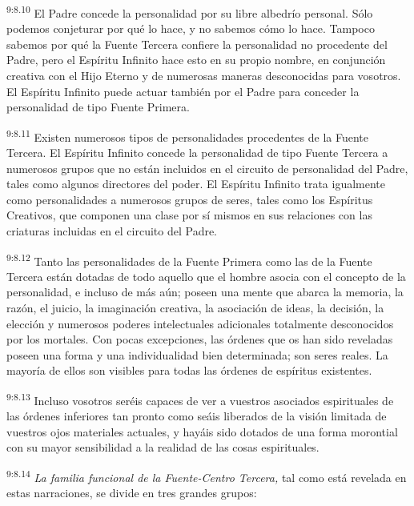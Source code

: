 \par
\textsuperscript{9:8.10} El Padre concede la personalidad por su libre albedrío personal. Sólo podemos conjeturar por qué lo hace, y no sabemos cómo lo hace. Tampoco sabemos por qué la Fuente Tercera confiere la personalidad no procedente del Padre, pero el Espíritu Infinito hace esto en su propio nombre, en conjunción creativa con el Hijo Eterno y de numerosas maneras desconocidas para vosotros. El Espíritu Infinito puede actuar también por el Padre para conceder la personalidad de tipo Fuente Primera.

\par
\textsuperscript{9:8.11} Existen numerosos tipos de personalidades procedentes de la Fuente Tercera. El Espíritu Infinito concede la personalidad de tipo Fuente Tercera a numerosos grupos que no están incluidos en el circuito de personalidad del Padre, tales como algunos directores del poder. El Espíritu Infinito trata igualmente como personalidades a numerosos grupos de seres, tales como los Espíritus Creativos, que componen una clase por sí mismos en sus relaciones con las criaturas incluidas en el circuito del Padre.

\par
\textsuperscript{9:8.12} Tanto las personalidades de la Fuente Primera como las de la Fuente Tercera están dotadas de todo aquello que el hombre asocia con el concepto de la personalidad, e incluso de más aún; poseen una mente que abarca la memoria, la razón, el juicio, la imaginación creativa, la asociación de ideas, la decisión, la elección y numerosos poderes intelectuales adicionales totalmente desconocidos por los mortales. Con pocas excepciones, las órdenes que os han sido reveladas poseen una forma y una individualidad bien determinada; son seres reales. La mayoría de ellos son visibles para todas las órdenes de espíritus existentes.

\par
\textsuperscript{9:8.13} Incluso vosotros seréis capaces de ver a vuestros asociados espirituales de las órdenes inferiores tan pronto como seáis liberados de la visión limitada de vuestros ojos materiales actuales, y hayáis sido dotados de una forma morontial con su mayor sensibilidad a la realidad de las cosas espirituales.

\par
\textsuperscript{9:8.14} \textit{La familia funcional de la Fuente-Centro Tercera,} tal como está revelada en estas narraciones, se divide en tres grandes grupos:

